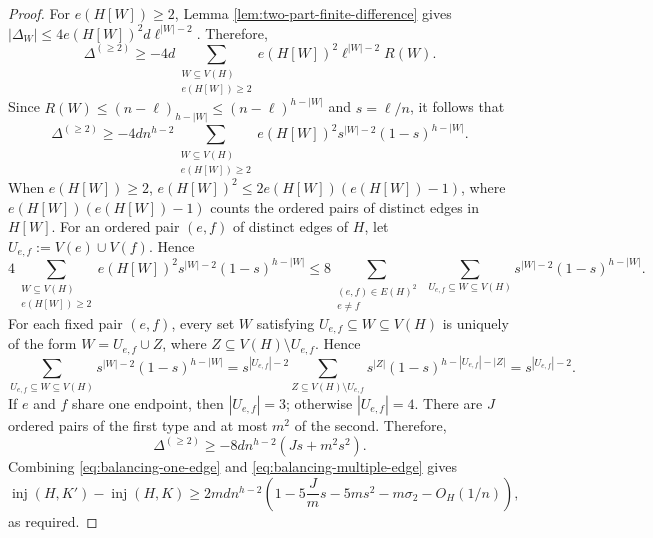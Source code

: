 \documentclass[11pt]{article}
\numberwithin{equation}{section}
\theoremstyle{definition}
\theoremstyle{remark}
\newcommand{\inj}{\operatorname{inj}}
\begin{document}
\begin{proof}
For $e(H[W])\ge2$, Lemma \ref{lem:two-part-finite-difference} gives $|\Delta_W|\le 4e(H[W])^2d\ell^{|W|-2}$. Therefore,
\[
\Delta^{(\ge2)}
\ge -4d\sum_{\substack{W\subseteq V(H)\\e(H[W])\ge2}}
e(H[W])^2\ell^{|W|-2}R(W).
\]
Since $R(W)\le(n-\ell)_{h-|W|}\le(n-\ell)^{h-|W|}$ and $s=\ell/n$,
it follows that
\[
\Delta^{(\ge2)}
\ge -4dn^{h-2}
\sum_{\substack{W\subseteq V(H)\\e(H[W])\ge2}}
e(H[W])^2s^{|W|-2}(1-s)^{h-|W|}.
\]
When $e(H[W])\ge2$, $e(H[W])^2\le2e(H[W])(e(H[W])-1)$, where $e(H[W])(e(H[W])-1)$ counts the ordered pairs of distinct edges in $H[W]$. For an ordered pair $(e,f)$ of distinct edges of $H$, let $U_{e,f}:=V(e)\cup V(f)$. Hence
\[
4\sum_{\substack{W\subseteq V(H)\\e(H[W])\ge2}}e(H[W])^2s^{|W|-2}(1-s)^{h-|W|}
\le 8\sum_{\substack{(e,f)\in E(H)^2\\e\ne f}}\ \sum_{U_{e,f}\subseteq W\subseteq V(H)}s^{|W|-2}(1-s)^{h-|W|}.
\]
For each fixed pair $(e,f)$, every set $W$ satisfying $U_{e,f}\subseteq W\subseteq V(H)$ is uniquely of the form $W=U_{e,f}\cup Z$, where $Z\subseteq V(H)\setminus U_{e,f}$. Hence
\[
\sum_{U_{e,f}\subseteq W\subseteq V(H)}s^{|W|-2}(1-s)^{h-|W|}
=s^{|U_{e,f}|-2}\sum_{Z\subseteq V(H)\setminus U_{e,f}}s^{|Z|}(1-s)^{h-|U_{e,f}|-|Z|}
=s^{|U_{e,f}|-2}.
\]
If $e$ and $f$ share one endpoint, then $|U_{e,f}|=3$; otherwise $|U_{e,f}|=4$. There are $J$ ordered pairs of the first type and at most $m^2$ of the second. Therefore,
\begin{equation}
\label{eq:balancing-multiple-edge}
\Delta^{(\ge2)}\ge -8dn^{h-2}(Js+m^2s^2).
\end{equation}
Combining \eqref{eq:balancing-one-edge} and \eqref{eq:balancing-multiple-edge} gives
\[
\inj(H,K')-\inj(H,K)
\ge2mdn^{h-2}
\left(1-5\frac{J}{m}s-5ms^2-m\sigma_2-O_H(1/n)\right),
\]
as required.
\end{proof}
\end{document}
